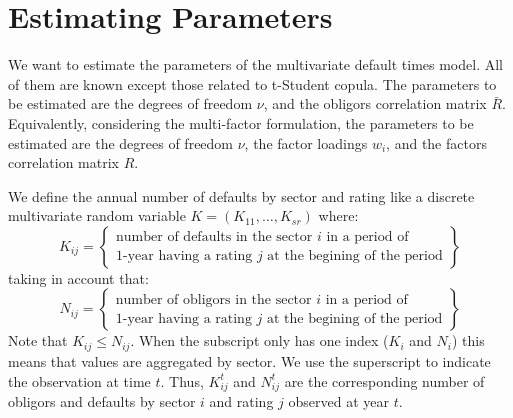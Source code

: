 \documentclass[11pt,fleqn]{book} %
\begin{document}
\chapter{Estimating Parameters}

We want to estimate the parameters of the multivariate default times model.
All of them are known except those related to t-Student copula. The 
parameters to be estimated are the degrees of freedom $\nu$, and the 
obligors correlation matrix $\bar{R}$. Equivalently, considering the 
multi-factor formulation, the parameters to be estimated are the degrees
of freedom $\nu$, the factor loadings $w_i$, and the factors correlation
matrix $R$.

\begin{definition}
	We define the annual number of defaults by sector and rating like a
	discrete multivariate random variable $K=(K_{11}, \dots, K_{sr})$ where:
	\begin{displaymath}
		K_{ij} = \left\{
		\begin{array}{c}
			\text{number of defaults in the sector $i$ in a period of} \\
			\text{1-year having a rating $j$ at the begining of the period}
		\end{array}
		\right\}
	\end{displaymath}
	taking in account that:
	\begin{displaymath}
		N_{ij} = \left\{
		\begin{array}{c}
			\text{number of obligors in the sector $i$ in a period of} \\
			\text{1-year having a rating $j$ at the begining of the period}
		\end{array}
		\right\}
	\end{displaymath}
	Note that $K_{ij} \le N_{ij}$.
	When the subscript only has one index ($K_{i}$ and $N_{i}$) this means 
	that values are aggregated by sector. We use the superscript to indicate 
	the observation at time $t$. Thus, $K_{ij}^t$ and $N_{ij}^t$ are the 
	corresponding number of obligors and defaults by sector $i$ and rating 
	$j$ observed at year $t$. 
\end{definition}

\end{document}
